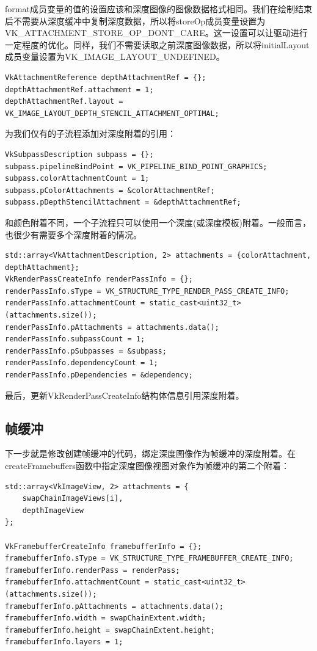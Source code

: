 \documentclass{ctexart}
\begin{document}
format成员变量的值的设置应该和深度图像的图像数据格式相同。我们在绘制结束后不需要从深度缓冲中复制深度数据，所以将storeOp成员变量设置为VK\_ATTACHMENT\_STORE\_OP\_DONT\_CARE。这一设置可以让驱动进行一定程度的优化。同样，我们不需要读取之前深度图像数据，所以将initialLayout成员变量设置为VK\_IMAGE\_LAYOUT\_UNDEFINED。

\begin{lstlisting}[language={[ANSI]C}]
VkAttachmentReference depthAttachmentRef = {};
depthAttachmentRef.attachment = 1;
depthAttachmentRef.layout = VK_IMAGE_LAYOUT_DEPTH_STENCIL_ATTACHMENT_OPTIMAL;
\end{lstlisting}

为我们仅有的子流程添加对深度附着的引用：

\begin{lstlisting}[language={[ANSI]C}]
VkSubpassDescription subpass = {};
subpass.pipelineBindPoint = VK_PIPELINE_BIND_POINT_GRAPHICS;
subpass.colorAttachmentCount = 1;
subpass.pColorAttachments = &colorAttachmentRef;
subpass.pDepthStencilAttachment = &depthAttachmentRef;
\end{lstlisting}

和颜色附着不同，一个子流程只可以使用一个深度(或深度模板)附着。一般而言，也很少有需要多个深度附着的情况。

\begin{lstlisting}[language={[ANSI]C}]
std::array<VkAttachmentDescription, 2> attachments = {colorAttachment, depthAttachment};
VkRenderPassCreateInfo renderPassInfo = {};
renderPassInfo.sType = VK_STRUCTURE_TYPE_RENDER_PASS_CREATE_INFO;
renderPassInfo.attachmentCount = static_cast<uint32_t>(attachments.size());
renderPassInfo.pAttachments = attachments.data();
renderPassInfo.subpassCount = 1;
renderPassInfo.pSubpasses = &subpass;
renderPassInfo.dependencyCount = 1;
renderPassInfo.pDependencies = &dependency;
\end{lstlisting}

最后，更新VkRenderPassCreateInfo结构体信息引用深度附着。

\subsection{帧缓冲}

下一步就是修改创建帧缓冲的代码，绑定深度图像作为帧缓冲的深度附着。在createFramebuffers函数中指定深度图像视图对象作为帧缓冲的第二个附着：

\begin{lstlisting}[language={[ANSI]C}]
std::array<VkImageView, 2> attachments = {
	swapChainImageViews[i],
	depthImageView
};

VkFramebufferCreateInfo framebufferInfo = {};
framebufferInfo.sType = VK_STRUCTURE_TYPE_FRAMEBUFFER_CREATE_INFO;
framebufferInfo.renderPass = renderPass;
framebufferInfo.attachmentCount = static_cast<uint32_t>(attachments.size());
framebufferInfo.pAttachments = attachments.data();
framebufferInfo.width = swapChainExtent.width;
framebufferInfo.height = swapChainExtent.height;
framebufferInfo.layers = 1;
\end{lstlisting}
\end{document}
